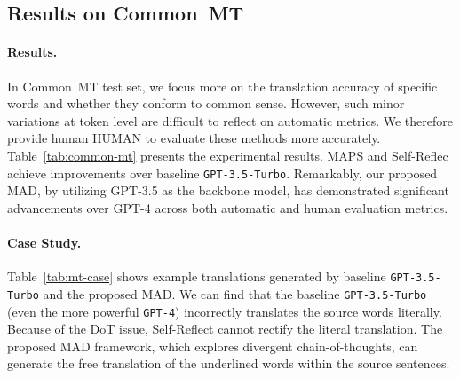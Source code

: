\subsection{Results on Common~MT}
\label{subsec_mt}

\paragraph{Results.}
In Common~MT test set, we focus more on the translation accuracy of specific words and whether they conform to common sense. However, such minor variations at token level are difficult to reflect on automatic metrics. We therefore provide human HUMAN to evaluate these methods more accurately.
Table~\ref{tab:common-mt} presents the experimental results. MAPS and Self-Reflec achieve improvements over baseline \texttt{GPT-3.5-Turbo}. Remarkably, our proposed MAD, by utilizing GPT-3.5 as the backbone model, has demonstrated significant advancements over GPT-4 across both automatic and human evaluation metrics. 


\begin{table}[!tb]
\centering
{}
\vspace{-5pt}
\caption{Example translations generated by different methods. Best viewed in color.}
\label{tab:mt-case}
\vspace{-10pt}
\end{table}

\paragraph{Case Study.} 
Table~\ref{tab:mt-case} shows example translations generated by baseline \texttt{GPT-3.5-Turbo} and the proposed MAD.  We can find that the baseline \texttt{GPT-3.5-Turbo} (even the more powerful \texttt{GPT-4}) incorrectly translates the source words literally. Because of the DoT issue, Self-Reflect cannot rectify the literal translation. The proposed MAD framework, which explores divergent chain-of-thoughts, can generate the free translation of the underlined words within the source sentences. 

